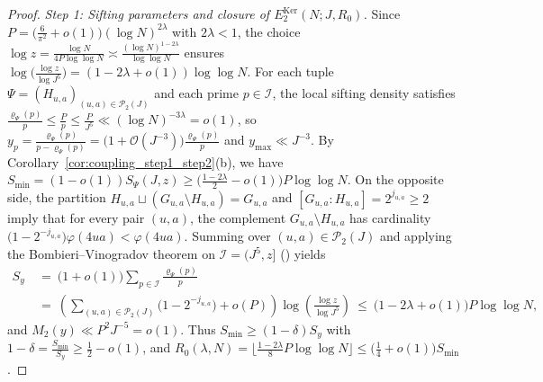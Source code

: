 \documentclass[11pt, a4paper]{article}
\theoremstyle{plain}
\theoremstyle{definition}
\begin{document}
\begin{proof}
\emph{Step 1: Sifting parameters and closure of $E_2^{\mathrm{Ker}}(N;J,R_0)$.}
Since $P=\big(\frac{6}{\pi^{2}}+o(1)\big)(\log N)^{2\lambda}$ with $2\lambda<1$, the choice $\log z=\frac{\log N}{4P\log\log N}\asymp\frac{(\log N)^{1-2\lambda}}{\log\log N}$ ensures $\log\big(\frac{\log z}{\log J^{5}}\big)=(1-2\lambda+o(1))\log\log N$. For each tuple $\Psi=(H_{u,a})_{(u,a)\in\mathcal{P}_2(J)}$ and each prime $p\in\mathcal{I}$, the local sifting density satisfies $\frac{\varrho_\Psi(p)}{p}\le\frac{P}{p}\le\frac{P}{J^{5}}\ll(\log N)^{-3\lambda}=o(1)$, so $y_p=\frac{\varrho_\Psi(p)}{p-\varrho_\Psi(p)}=\big(1+\mathcal{O}(J^{-3})\big)\frac{\varrho_\Psi(p)}{p}$ and $y_{\max}\ll J^{-3}$. By Corollary~\ref{cor:coupling_step1_step2}(b), we have $S_{\min}=(1-o(1))S_\Psi(J,z)\ge\big(\frac{1-2\lambda}{2}-o(1)\big)P\log\log N$. On the opposite side, the partition $H_{u,a}\sqcup(G_{u,a}\setminus H_{u,a})=G_{u,a}$ and $[G_{u,a}:H_{u,a}]=2^{j_{u,a}}\ge 2$ imply that for every pair $(u,a)$, the complement $G_{u,a}\setminus H_{u,a}$ has cardinality $\big(1-2^{-j_{u,a}}\big)\varphi(4ua)<\varphi(4ua)$. Summing over $(u,a)\in\mathcal{P}_2(J)$ and applying the Bombieri--Vinogradov theorem on $\mathcal{I}=(J^{5},z]$ (\cite[Lemma~4.23]{dahan2026a}) yields
\[
\begin{aligned}
S_y\ &=\ \big(1+o(1)\big)\sum_{p\in\mathcal{I}}\frac{\varrho_\Psi(p)}{p}\\
&=\ \left(\sum_{(u,a)\in\mathcal{P}_2(J)}\big(1-2^{-j_{u,a}}\big)+o(P)\right)\log\!\left(\frac{\log z}{\log J^{5}}\right)\ \le\ \big(1-2\lambda+o(1)\big)P\log\log N,
\end{aligned}
\]
and $M_2(y)\ll P^{2}J^{-5}=o(1)$. Thus $S_{\min}\ge(1-\delta)S_y$ with $1-\delta=\frac{S_{\min}}{S_y}\ge\frac12-o(1)$, and $R_0(\lambda,N)=\big\lfloor\frac{1-2\lambda}{8}P\log\log N\big\rfloor\le\big(\frac14+o(1)\big)S_{\min}$.


\end{proof}
\end{document}
